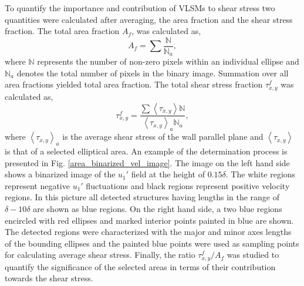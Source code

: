 \documentclass{svjour3}                     %
\begin{document}
To quantify the importance and contribution of VLSMs to shear stress two quantities were calculated after averaging, the area fraction and the shear stress fraction. The total area fraction $A_f$, was calculated as, 
\begin{equation*}
		A_f = \sum \frac{\mathbb{N}}{\mathbb{N}_a},
\label{eqn:area_frac_def}        
\end{equation*}
\noindent where $\mathbb{N}$ represents the number of non-zero pixels  within an individual ellipse and $\mathbb{N}_a$ denotes the total number of pixels in the binary image. Summation over all area fractions yielded total area fraction. The total shear stress fraction $\tau_{x,y}^f$ was  calculated as, 
\begin{equation*}
		\tau_{x,y}^f =\frac{\sum \left < \tau_{x,y} \right > \mathbb{N}}{\left < \tau_{x,y}\right >_a\mathbb{N}_a },
\label{eqn:stress_frac_def}             
\end{equation*}
\noindent where $\left < \tau_{x,y}\right >_a$  is the average shear stress of the wall parallel plane and $\left < \tau_{x,y} \right >$ is that of a selected elliptical area.  An example of the determination process is presented in Fig. \ref{area_binarized_vel_image}. The image on the left hand side shows  a binarized image of the $u_{1}'$ field at the height of $0.15\delta$.  The white regions represent negative $u_{1}'$ fluctuations and black regions represent positive velocity regions. In this picture all detected structures having  lengths in the range  of $\delta-10\delta$ are shown as blue regions. On the right hand side, a two blue regions  encircled with red  ellipses and marked interior points painted in blue are shown.  The detected regions were characterized with the major and minor axes lengths of the bounding ellipses and the painted blue points were used as sampling points for calculating average shear stress. Finally, the ratio $\tau_{x,y}^f/A_f$ was studied to quantify the significance of the selected areas in terms of  their contribution towards the shear stress.  
\graphicspath{{chap1Img/}}
\end{document}
